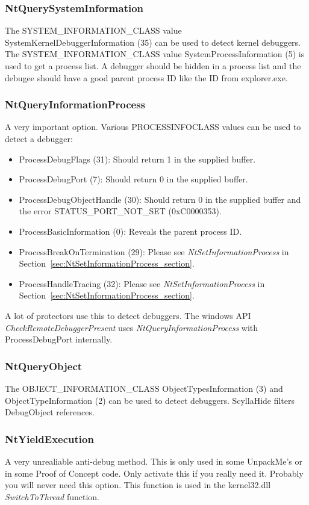\documentclass[10pt,a4paper]{article}
\begin{document}
\subsubsection{NtQuerySystemInformation}
The SYSTEM\_INFORMATION\_CLASS value SystemKernelDebuggerInformation (35) can be used to detect kernel debuggers. The SYSTEM\_INFORMATION\_CLASS value SystemProcessInformation (5) is used to get a process list. A debugger should be hidden in a process list and the debugee should have a good parent process ID like the ID from explorer.exe.

\subsubsection{NtQueryInformationProcess}
A very important option. Various PROCESSINFOCLASS values can be used to detect a debugger:
\begin{itemize}
\item ProcessDebugFlags (31): Should return 1 in the supplied buffer.
\item ProcessDebugPort (7): Should return 0 in the supplied buffer.
\item ProcessDebugObjectHandle (30): Should return 0 in the supplied buffer and the error STATUS\_PORT\_NOT\_SET (0xC0000353).
\item ProcessBasicInformation (0): Reveals the parent process ID.
\item ProcessBreakOnTermination (29): Please see \textit{NtSetInformationProcess} in Section~\ref{sec:NtSetInformationProcess_section}.
\item ProcessHandleTracing (32): Please see \textit{NtSetInformationProcess} in Section~\ref{sec:NtSetInformationProcess_section}.
\end{itemize}
A lot of protectors use this to detect debuggers. The windows API \textit{CheckRemoteDebuggerPresent} uses \textit{NtQueryInformationProcess} with ProcessDebugPort internally.

\subsubsection{NtQueryObject}
The OBJECT\_INFORMATION\_CLASS ObjectTypesInformation (3) and ObjectTypeInformation (2) can be used to detect debuggers. ScyllaHide filters DebugObject references.

\subsubsection{NtYieldExecution}
A very unrealiable anti-debug method. This is only used in some UnpackMe's or in some Proof of Concept code. Only activate this if you really need it. Probably you will never need this option. This function is used in the kernel32.dll \textit{SwitchToThread} function.
\end{document}
